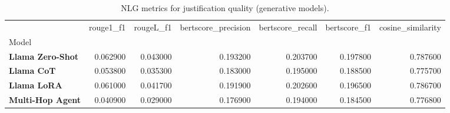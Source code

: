 \begin{table}
\caption{NLG metrics for justification quality (generative models).}
\label{tab:nlg_results}
\begin{tabular}{lrrrrrr}
\toprule
 & rouge1_f1 & rougeL_f1 & bertscore_precision & bertscore_recall & bertscore_f1 & cosine_similarity \\
Model &  &  &  &  &  &  \\
\midrule
\textbf{Llama Zero-Shot} & 0.062900 & 0.043000 & 0.193200 & 0.203700 & 0.197800 & 0.787600 \\
\textbf{Llama CoT} & 0.053800 & 0.035300 & 0.183000 & 0.195000 & 0.188500 & 0.775700 \\
\textbf{Llama LoRA} & 0.061000 & 0.041700 & 0.191900 & 0.202600 & 0.196500 & 0.786700 \\
\textbf{Multi-Hop Agent} & 0.040900 & 0.029000 & 0.176900 & 0.194000 & 0.184500 & 0.776800 \\
\bottomrule
\end{tabular}
\end{table}
